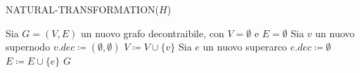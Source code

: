 \begin{algorithm}[H]
    \begin{algorithmic}[1]
        \caption{NATURAL-TRANSFORMATION($H$)}\label{alg:natural-transformation}
        \State Sia $G = (V, E)$ un nuovo grafo decontraibile, con $V = \emptyset$ e $E = \emptyset$
            \State Sia $v$ un nuovo supernodo
            \State $v.dec \coloneqq (\emptyset, \emptyset)$
            \State $V \coloneqq V \cup \{v\}$
        \EndFor
            \State Sia $e$ un nuovo superarco
            \State $e.dec \coloneqq \emptyset$
            \State $E \coloneqq E \cup \{e\}$
        \EndFor
        \State \Return $G$
    \end{algorithmic}
\end{algorithm}
